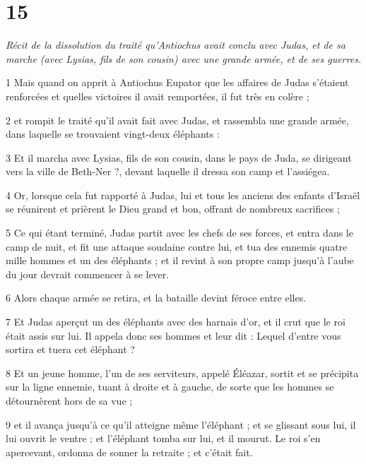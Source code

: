 \chapter{15}

\par \textit{Récit de la dissolution du traité qu'Antiochus avait conclu avec Judas, et de sa marche (avec Lysias, fils de son cousin) avec une grande armée, et de ses guerres.}

\par 1 Mais quand on apprit à Antiochus Eupator que les affaires de Judas s'étaient renforcées et quelles victoires il avait remportées, il fut très en colère ;

\par 2 et rompit le traité qu'il avait fait avec Judas, et rassembla une grande armée, dans laquelle se trouvaient vingt-deux éléphants :

\par 3 Et il marcha avec Lysias, fils de son cousin, dans le pays de Juda, se dirigeant vers la ville de Beth-Ner ?, devant laquelle il dressa son camp et l'assiégea.

\par 4 Or, lorsque cela fut rapporté à Judas, lui et tous les anciens des enfants d'Israël se réunirent et prièrent le Dieu grand et bon, offrant de nombreux sacrifices ;

\par 5 Ce qui étant terminé, Judas partit avec les chefs de ses forces, et entra dans le camp de nuit, et fit une attaque soudaine contre lui, et tua des ennemis quatre mille hommes et un des éléphants ; et il revint à son propre camp jusqu'à l'aube du jour devrait commencer à se lever.

\par 6 Alors chaque armée se retira, et la bataille devint féroce entre elles.

\par 7 Et Judas aperçut un des éléphants avec des harnais d'or, et il crut que le roi était assis sur lui. Il appela donc ses hommes et leur dit : Lequel d'entre vous sortira et tuera cet éléphant ?

\par 8 Et un jeune homme, l'un de ses serviteurs, appelé Éléazar, sortit et se précipita sur la ligne ennemie, tuant à droite et à gauche, de sorte que les hommes se détournèrent hors de sa vue ;

\par 9 et il avança jusqu'à ce qu'il atteigne même l'éléphant ; et se glissant sous lui, il lui ouvrit le ventre ; et l'éléphant tomba sur lui, et il mourut. Le roi s'en apercevant, ordonna de sonner la retraite ; et c'était fait.

